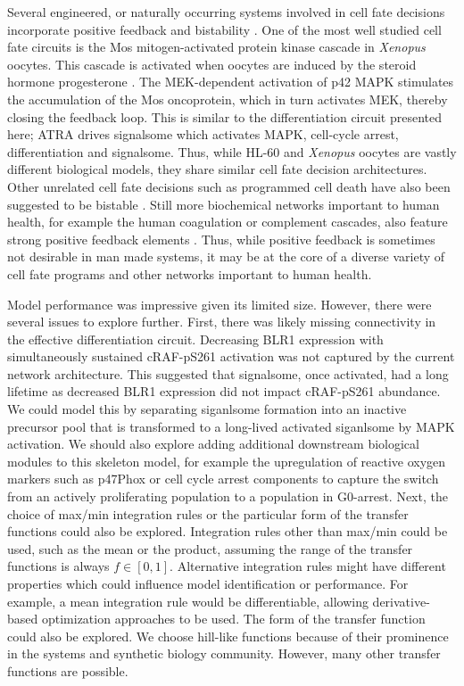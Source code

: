 \documentclass[10pt,twocolumn,twoside,final]{IEEEtran}
\begin{document}
Several engineered, or naturally occurring systems involved in cell fate decisions incorporate positive feedback and bistability \cite{Ferrell:2002aa}.
One of the most well studied cell fate circuits is the Mos mitogen-activated protein kinase cascade in \textit{Xenopus} oocytes.
This cascade is activated when oocytes are induced by the steroid hormone progesterone \cite{Xiong:2003aa}.
The MEK-dependent activation of p42 MAPK stimulates the accumulation of the Mos oncoprotein, which in turn activates MEK, thereby closing the feedback loop.
This is similar to the differentiation circuit presented here; ATRA drives signalsome which activates MAPK, cell-cycle arrest, differentiation and signalsome.
Thus, while HL-60 and \textit{Xenopus} oocytes are vastly different biological models, they share similar cell fate decision architectures.
Other unrelated cell fate decisions such as programmed cell death have also been suggested to be bistable \cite{Bagci:2006aa}.
Still more biochemical networks important to human health, for example the human coagulation or complement cascades, also feature strong positive feedback elements \cite{Luan:2007aa}.
Thus, while positive feedback is sometimes not desirable in man made systems, it may be at the core of a diverse variety of
cell fate programs and other networks important to human health.

Model performance was impressive given its limited size. However, there were several issues to explore further.
First, there was likely missing connectivity in the effective differentiation circuit.
Decreasing BLR1 expression with simultaneously sustained cRAF-pS261 activation was not captured by the current network architecture.
This suggested that signalsome, once activated, had a long lifetime as decreased BLR1 expression did not impact cRAF-pS261 abundance.
We could model this by separating siganlsome formation into an inactive precursor pool that is transformed to a long-lived activated siganlsome by MAPK activation.
We should also explore adding additional downstream biological modules to this skeleton model, for example the upregulation of reactive oxygen markers such as p47Phox or
cell cycle arrest components to capture the switch from an actively proliferating population to a population in G0-arrest.
Next, the choice of max/min integration rules or the particular form of the transfer functions could also be explored.
Integration rules other than max/min could be used, such as the mean or the product, assuming the range of the transfer functions is always $f\in[0,1]$.
Alternative integration rules might have different properties which could influence model identification or performance.
For example, a mean integration rule would be differentiable, allowing derivative-based optimization approaches to be used.
The form of the transfer function could also be explored. We choose hill-like functions because of their
prominence in the systems and synthetic biology community. However, many other transfer functions are possible.
\end{document}
